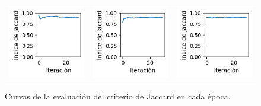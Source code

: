 \begin{figure}[!b]
\begin{tabular}{ccc}
        \includegraphics[width=4.5cm]{../Plots/score_epoch_6.png} &
        \includegraphics[width=4.5cm]{../Plots/score_epoch_7.png} &
        \includegraphics[width=4.5cm]{../Plots/score_epoch_8.png} \\
        
    \end{tabular}
    \caption{Curvas de la evaluación del criterio de Jaccard en cada época.}
    \label{fig:iou_epochs}
\end{figure}

